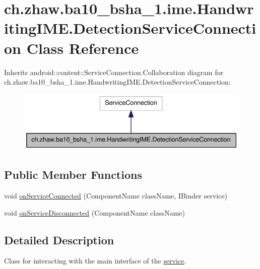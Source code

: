 \hypertarget{classch_1_1zhaw_1_1ba10__bsha__1_1_1ime_1_1HandwritingIME_1_1DetectionServiceConnection}{
\section{ch.zhaw.ba10\_\-bsha\_\-1.ime.HandwritingIME.DetectionServiceConnection Class Reference}
\label{classch_1_1zhaw_1_1ba10__bsha__1_1_1ime_1_1HandwritingIME_1_1DetectionServiceConnection}
}


Inherits android::content::ServiceConnection.Collaboration diagram for ch.zhaw.ba10\_\-bsha\_\-1.ime.HandwritingIME.DetectionServiceConnection:\nopagebreak
\begin{figure}[H]
\begin{center}
\leavevmode
\includegraphics[width=372pt]{classch_1_1zhaw_1_1ba10__bsha__1_1_1ime_1_1HandwritingIME_1_1DetectionServiceConnection__coll__graph}
\end{center}
\end{figure}
\subsection*{Public Member Functions}
\begin{DoxyCompactItemize}
\item 
void \hyperlink{classch_1_1zhaw_1_1ba10__bsha__1_1_1ime_1_1HandwritingIME_1_1DetectionServiceConnection_a84e859d739686eac5aef4cb854f96383}{onServiceConnected} (ComponentName className, IBinder service)
\item 
void \hyperlink{classch_1_1zhaw_1_1ba10__bsha__1_1_1ime_1_1HandwritingIME_1_1DetectionServiceConnection_a987af315419dc97936af4b55375cd03b}{onServiceDisconnected} (ComponentName className)
\end{DoxyCompactItemize}


\subsection{Detailed Description}
Class for interacting with the main interface of the \hyperlink{namespacech_1_1zhaw_1_1ba10__bsha__1_1_1service}{service}. 

